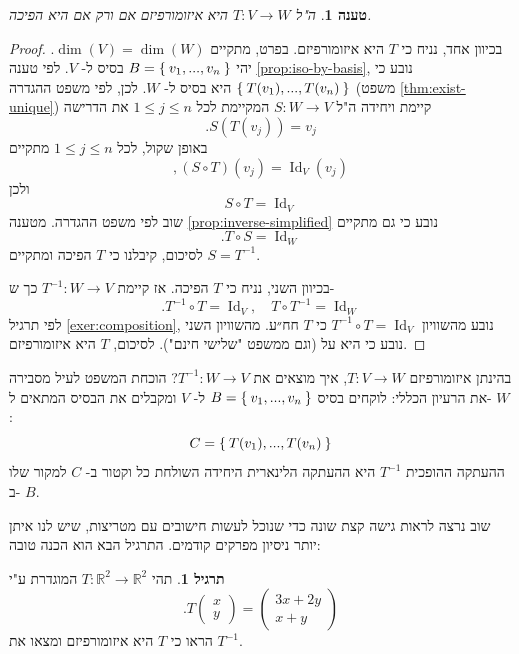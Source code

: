 \documentclass[12pt]{report}
\theoremstyle{plain}
\newtheorem{proposition}[theorem]{טענה}
\theoremstyle{definition}
\newtheorem{exercise}{תרגיל}[chapter]
\newcommand{\R}{\mathbb{R}}
\newcommand{\0}{\mathbf{0}}
\DeclareMathOperator{\Id}{Id}
\begin{document}
\begin{proposition}\label{prop:iso-invertible}
ה"ל
$T:V\to W$
היא איזומורפיזם אם ורק אם היא הפיכה.
\end{proposition}

\begin{proof}
בכיוון אחד, נניח כי
$T$
היא איזומורפיזם. בפרט, מתקיים
$\dim(V)=\dim(W)$.
יהי
$B=\Set{v_1,...,v_n}$
בסיס ל-
$V$.
לפי טענה 
\ref{prop:iso-by-basis},
נובע כי
$\Set{T(v_1),...,T(v_n)}$
היא בסיס ל-
$W$.
לכן, לפי משפט ההגדרה (משפט
\ref{thm:exist-unique})
קיימת ויחידה ה"ל
$S:W\to V$
המקיימת לכל
$1\leq j\leq n$
את הדרישה
$$
.S(T(v_j))=v_j
$$
באופן שקול, לכל
$1\leq j\leq n$
מתקיים
$$
,(S\circ T)(v_j)=\Id_V(v_j)
$$
ולכן
$$
S\circ T=\Id_V
$$
שוב לפי משפט ההגדרה. מטענה
\ref{prop:inverse-simplified}
נובע כי גם מתקיים
$$
.T\circ S=\Id_W
$$
לסיכום, קיבלנו כי
$T$
הפיכה ומתקיים
$S=T^{-1}$.

בכיוון השני, נניח כי
$T$
הפיכה. אז קיימת 
$T^{-1}:W\to V$
כך ש-
$$
.T^{-1}\circ T=\Id_V,\quad T\circ T^{-1}=\Id_W
$$
לפי תרגיל
\ref{exer:composition},
נובע מהשוויון 
$T^{-1}\circ T=\Id_V$
כי
$T$
חח״ע. מהשוויון השני נובע כי היא על (וגם ממשפט "שלישי חינם"). לסיכום, 
$T$
היא איזומורפיזם.

\end{proof}

בהינתן איזומורפיזם 
$T:V\to W$,
איך מוצאים את
$T^{-1}:W\to V$?
הוכחת המשפט לעיל מסבירה את הרעיון הכללי: לוקחים בסיס
$B=\Set{v_1,...,v_n}$
ל-
$V$
ומקבלים את הבסיס המתאים ל-
$W$:
$$
C=\Set{T(v_1),...,T(v_n)}
$$
ההעתקה ההופכית 
$T^{-1}$
היא ההעתקה הלינארית היחידה השולחת כל וקטור ב-
$C$
למקור שלו ב-
$B$.

שוב נרצה לראות גישה קצת שונה כדי שנוכל לעשות חישובים עם מטריצות, שיש לנו איתן יותר ניסיון מפרקים קודמים. התרגיל הבא הוא הכנה טובה:

\begin{exercise}
תהי
$T:\R^2\to\R^2$
המוגדרת ע"י
$$
.T\begin{pmatrix}x\\y\end{pmatrix}=\begin{pmatrix}
3x+2y \\
x+y
\end{pmatrix}
$$
הראו כי
$T$
היא איזומורפיזם ומצאו את
$T^{-1}$.
\end{exercise}
\end{document}
